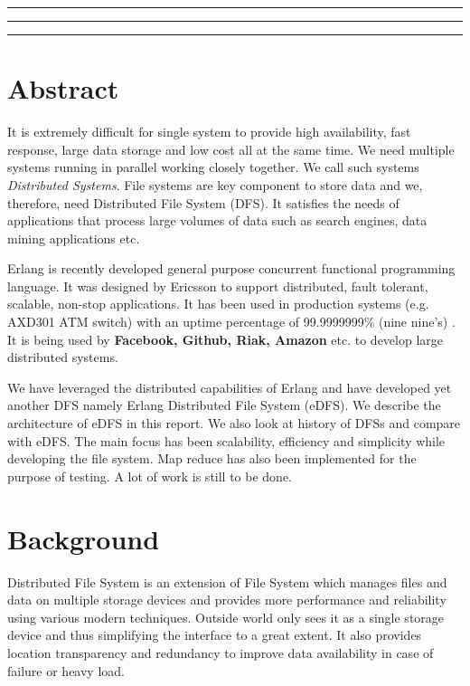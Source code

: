 \documentclass[a4paper,12pt]{article}
\begin{document}

\tableofcontents
\vspace{0.5cm}
\hrule \hrule \hrule
\newpage

\section*{Abstract}
It is extremely difficult for single system to provide high availability, fast response, large data storage and low cost all at the same time. We need multiple systems running in parallel working closely together. We call such systems \textit{Distributed Systems}. File systems are key component to store data and we, therefore, need Distributed File System (DFS). It satisfies the needs of applications that process large volumes of data such as search engines, data mining applications etc.

Erlang is recently developed general purpose concurrent functional programming language. It was designed by Ericsson to support distributed, fault tolerant, scalable, non-stop applications. It has been used in production systems (e.g. AXD301 ATM switch) with an uptime percentage of 99.9999999\% (nine nine's) \cite[p.~170]{armstrong} \cite{blog_joe}. It is being used by \textbf{Facebook, Github, Riak, Amazon} etc. to develop large distributed systems.

We have leveraged the distributed capabilities of Erlang and have developed yet another DFS namely Erlang Distributed File System (eDFS). We describe the architecture of eDFS in this report. We also look at history of DFSs and compare with eDFS. The main focus has been scalability, efficiency and simplicity while developing the file system. Map reduce has also been implemented for the purpose of testing. A lot of work is still to be done.

\section{Background}
Distributed File System is an extension of File System which manages files and data on multiple storage devices and provides more performance and reliability using various modern techniques. Outside world only sees it as a single storage device and thus simplifying the interface to a great extent. It also provides location transparency and redundancy to improve data availability in case of failure or heavy load.
\end{document}
